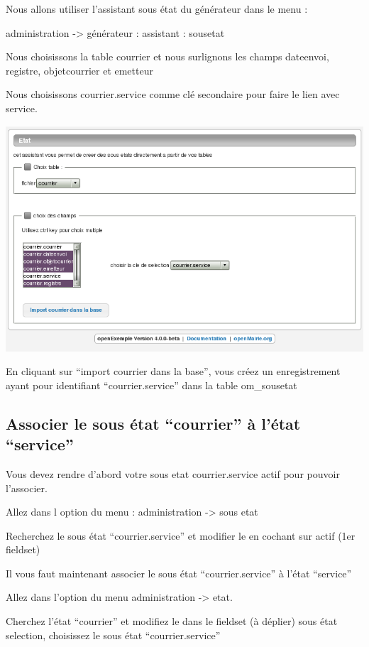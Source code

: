 \documentclass[letterpaper,10pt,french]{manual}
\begin{document}
Nous allons utiliser l'assistant sous état du générateur dans le menu :

administration -\textgreater{} générateur  : assistant : sousetat

Nous choisissons la table courrier et nous surlignons les champs
dateenvoi, registre, objetcourrier et emetteur

Nous choisissons courrier.service comme clé secondaire pour faire le lien
avec service.

\includegraphics{utilisation_13.png}

En cliquant sur ``import courrier dans la base'', vous créez un enregistrement
ayant pour identifiant ``courrier.service'' dans la table om\_sousetat


\subsection{Associer le sous état ``courrier'' à l'état ``service''}

Vous devez rendre d'abord votre sous etat courrier.service actif pour pouvoir l'associer.

Allez dans l option du menu : administration -\textgreater{} sous etat

Recherchez le sous état ``courrier.service'' et modifier le en cochant sur actif
(1er fieldset)

Il vous faut maintenant associer le sous état ``courrier.service'' à l'état ``service''

Allez dans l'option du menu administration -\textgreater{} etat.

Cherchez l'état ``courrier'' et modifiez le dans le fieldset (à déplier)
sous état selection, choisissez le sous état ``courrier.service''
\end{document}
